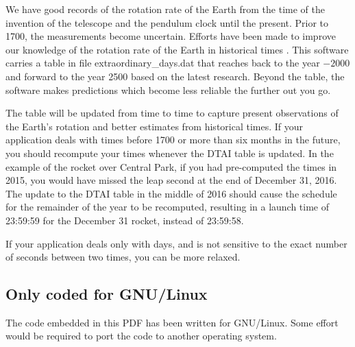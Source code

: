 \documentclass[letterpaper,twoside]{article}
\begin{document}
We have good records of the rotation rate of the Earth from the time
of the invention of the telescope and the pendulum clock until
the present.  Prior to 1700, the measurements become uncertain.
Efforts have been made to improve our knowledge of the rotation
rate of the Earth in historical times\citep{2004JHA....35..327M}%
\citep{2005JHA....36..339M}\citep{1997A&A...322..347S}%
\citep{2011ASSP...23....3S}\citep{1986PEPI...44..281M}%
\citep{Stephenson20160404}.
This software carries a table in file {\ttfamily extraordinary\_days.dat}
that reaches back to the year $-2000$ and forward to
the year \num{2500} based on the latest research.
Beyond the table, the software makes predictions which become less
reliable the further out you go.

The table will be updated from time to time to capture present
observations of the Earth's rotation and better estimates from
historical times.  If your application deals with times before
1700 or more than six months in the future, you should recompute
your times whenever the DTAI table is updated.  In the example
of the rocket over Central Park, if you had pre-computed the times
in 2015, you would have missed the leap second at the end of
December 31, 2016.  The update to the DTAI table in the middle
of 2016 should cause the schedule for the remainder of the year
to be recomputed, resulting in a launch time of 23:59:59 for
the December 31 rocket, instead of 23:59:58.

If your application deals only with days, and is not sensitive
to the exact number of seconds between two times, you can be
more relaxed.

\subsection{Only coded for GNU/Linux}
The code embedded in this PDF has been written for GNU/Linux.
Some effort would be required to port the code to another
operating system.
\end{document}
